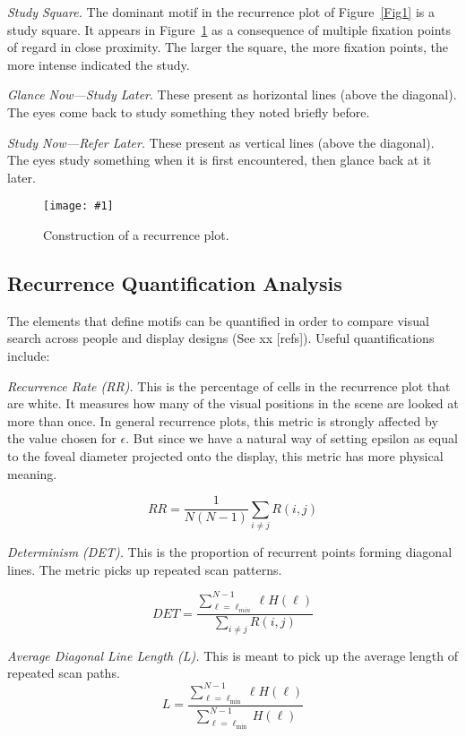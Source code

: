 \documentclass{sigchi}
\newcommand{\insertpicture}[2]{\begin{center}\texttt{[image: \#1]}\end{center}}
\begin{document}
\emph{Study Square.} The dominant motif in the recurrence plot of
Figure~\ref{Fig1} is a study square. It appears in Figure~\ref{fig:construct} as a
consequence of multiple fixation points of regard in close proximity. The
larger the square, the more fixation points, the more intense indicated the
study.

\emph{Glance Now—Study Later}. These present as horizontal lines (above the
diagonal). The eyes come back to study something they noted briefly before.

\emph{Study Now—Refer Later}. These present as vertical lines (above the
diagonal). The eyes study something when it is first encountered, then
glance back at it later.

\begin{figure}
	\insertpicture{figures/rpconstruction.pdf}{0.45}
	\caption{ Construction of a recurrence plot. \label{fig:construct}}
\end{figure}


\subsection{Recurrence Quantification Analysis} The elements that define
motifs can be quantified in order to compare visual search across people
and display designs (See xx [refs]). Useful quantifications include: 

\emph{Recurrence Rate (RR).} This is the percentage of cells in the
recurrence plot that are white. It measures how many of the visual
positions in the scene are looked at more than once. In general recurrence
plots, this metric is strongly affected by the value chosen for $\epsilon$.
But since we have a natural way of setting epsilon as equal to the foveal
diameter projected onto the display, this metric has more physical meaning.

\[
	RR = {\frac{1}{N(N-1)}}{\sum_{i\neq j}{R(i,j)}}
\]

\emph{Determinism (DET).} This is the proportion of recurrent points
forming diagonal lines. The metric picks up repeated scan patterns.

\[
	DET = 
	\frac{
		\sum_{\ell=\ell_{min}}^{N-1}{\ell H(\ell)}
	}{
		\sum_{i\neq j} { R(i,j) }
	}
\]

\emph{Average Diagonal Line Length (L).} This is meant to pick up the
average length of repeated scan paths.
\[
	L = 
	\frac{
		\sum_{\ell=\ell_{\min} }^{N-1}{\ell H(\ell)}
 	}{
		\sum_{\ell=\ell_{\min} }^{N-1}{ H(\ell) }
 	}
\]
\end{document}
